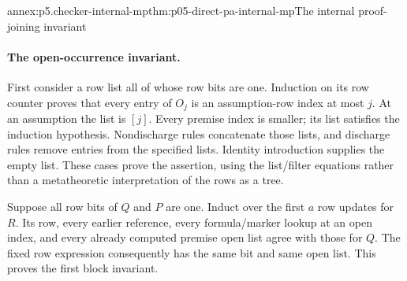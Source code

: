 \begin{annexitem}{annex:p5.checker-internal-mp}{thm:p05-direct-pa-internal-mp}{The internal proof-joining invariant}
\paragraph{The open-occurrence invariant.}
First consider a row list all of whose row bits are one.  Induction on its
row counter proves that every entry of \(O_j\) is an assumption-row index
at most \(j\).  At an assumption the list is \([j]\).  Every premise
index is smaller; its list satisfies the induction hypothesis.  Nondischarge
rules concatenate those lists, and discharge rules remove entries from the
specified lists.  Identity introduction supplies the empty list.  These
cases prove the assertion, using the list/filter equations rather than a
metatheoretic interpretation of the rows as a tree.

Suppose all row bits of \(Q\) and \(P\) are one.  Induct over the first
\(a\) row updates for \(R\).  Its row, every earlier reference, every
formula/marker lookup at an open index, and every already computed premise
open list agree with those for \(Q\).  The fixed row expression consequently
has the same bit and same open list.  This proves the first block invariant.


\end{annexitem}
